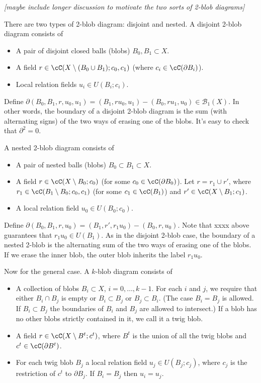 \documentclass[11pt,leqno]{amsart}
\def\bc{{\mathcal B}}
\def\bd{\partial}
\def\sub{\subset}
\def\setmin{\setminus}
\def\nn#1{{{\it \small [#1]}}}
\begin{document}
\nn{maybe include longer discussion to motivate the two sorts of 2-blob diagrams}

There are two types of 2-blob diagram: disjoint and nested.
A disjoint 2-blob diagram consists of
\begin{itemize}
\item A pair of disjoint closed balls (blobs) $B_0, B_1 \sub X$.
\item A field $r \in \cC(X \setmin (B_0 \cup B_1); c_0, c_1)$
(where $c_i \in \cC(\bd B_i)$).
\item Local relation fields $u_i \in U(B_i; c_i)$.
\end{itemize}
Define $\bd(B_0, B_1, r, u_0, u_1) = (B_1, ru_0, u_1) - (B_0, ru_1, u_0) \in \bc_1(X)$.
In other words, the boundary of a disjoint 2-blob diagram
is the sum (with alternating signs)
of the two ways of erasing one of the blobs.
It's easy to check that $\bd^2 = 0$.

A nested 2-blob diagram consists of
\begin{itemize}
\item A pair of nested balls (blobs) $B_0 \sub B_1 \sub X$.
\item A field $r \in \cC(X \setmin B_0; c_0)$
(for some $c_0 \in \cC(\bd B_0)$).
Let $r = r_1 \cup r'$, where $r_1 \in \cC(B_1 \setmin B_0; c_0, c_1)$
(for some $c_1 \in \cC(B_1)$) and
$r' \in \cC(X \setmin B_1; c_1)$.
\item A local relation field $u_0 \in U(B_0; c_0)$.
\end{itemize}
Define $\bd(B_0, B_1, r, u_0) = (B_1, r', r_1u_0) - (B_0, r, u_0)$.
Note that xxxx above guarantees that $r_1u_0 \in U(B_1)$.
As in the disjoint 2-blob case, the boundary of a nested 2-blob is the alternating
sum of the two ways of erasing one of the blobs.
If we erase the inner blob, the outer blob inherits the label $r_1u_0$.

Now for the general case.
A $k$-blob diagram consists of
\begin{itemize}
\item A collection of blobs $B_i \sub X$, $i = 0, \ldots, k-1$.
For each $i$ and $j$, we require that either $B_i \cap B_j$ is empty or
$B_i \sub B_j$ or $B_j \sub B_i$.
(The case $B_i = B_j$ is allowed.
If $B_i \sub B_j$ the boundaries of $B_i$ and $B_j$ are allowed to intersect.)
If a blob has no other blobs strictly contained in it, we call it a twig blob.
\item A field $r \in \cC(X \setmin B^t; c^t)$,
where $B^t$ is the union of all the twig blobs and $c^t \in \cC(\bd B^t)$.
\item For each twig blob $B_j$ a local relation field $u_j \in U(B_j; c_j)$,
where $c_j$ is the restriction of $c^t$ to $\bd B_j$.
If $B_i = B_j$ then $u_i = u_j$.
\end{itemize}
\end{document}
